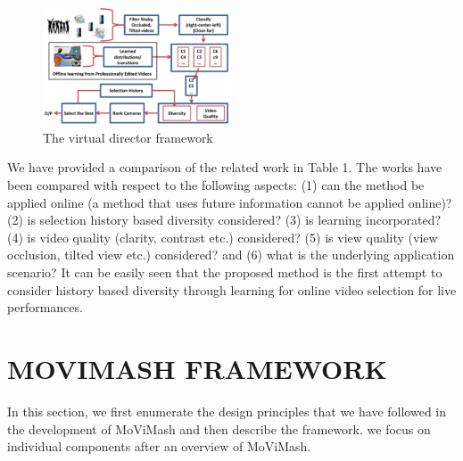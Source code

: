 \documentclass{sig-alternate}
\begin{document}
\begin{figure}[h]
    \centering
    \includegraphics[width=0.5\textwidth]{img2.png}
    \caption{The virtual director framework}
    \label{fig:mesh2}
\end{figure}

We have provided a comparison of the related work in Table 1. The works have been compared with respect to the following aspects: (1) can the method be applied online (a method that uses future information cannot be applied online)? (2) is selection history based diversity considered? (3) is learning incorporated? (4) is video quality (clarity, contrast etc.) considered? (5) is view quality (view occlusion, tilted view etc.) considered? and (6) what is the underlying application scenario? It can be easily seen that the proposed method is the first attempt to consider history based diversity through learning for online video selection for live performances.
\section {MOVIMASH FRAMEWORK}
In this section, we first enumerate the design principles that we have followed in the development of MoViMash and then describe the framework. we focus on individual components after an overview of MoViMash.
\end{document}
